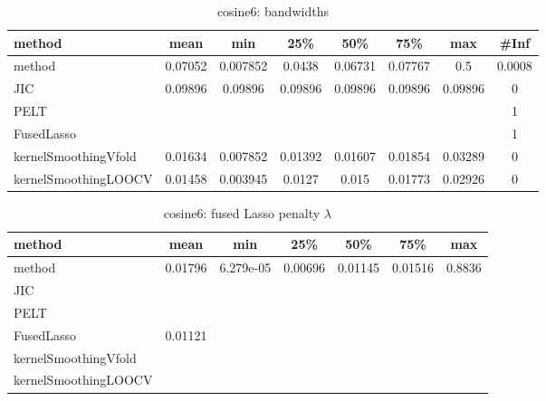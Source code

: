 \begin{table}[ht]
\centering
\begin{tabular}{l|c|ccccc|c}
  \hline
method & mean & min & 25\% & 50\% & 75\% & max & \#Inf \\ 
  \hline
method & 0.07052 & 0.007852 & 0.0438 & 0.06731 & 0.07767 &   0.5 & 0.0008 \\ 
  JIC & 0.09896 & 0.09896 & 0.09896 & 0.09896 & 0.09896 & 0.09896 &   0 \\ 
  PELT &  &  &  &  &  &  &   1 \\ 
  FusedLasso &  &  &  &  &  &  &   1 \\ 
  kernelSmoothingVfold & 0.01634 & 0.007852 & 0.01392 & 0.01607 & 0.01854 & 0.03289 &   0 \\ 
  kernelSmoothingLOOCV & 0.01458 & 0.003945 & 0.0127 & 0.015 & 0.01773 & 0.02926 &   0 \\ 
   \hline
\end{tabular}
\caption{cosine6: bandwidths} 
\label{tab:cosine6Bandwidths}
\end{table}
\begin{table}[ht]
\centering
\begin{tabular}{l|c|ccccc}
  \hline
method & mean & min & 25\% & 50\% & 75\% & max \\ 
  \hline
method & 0.01796 & 6.279e-05 & 0.00696 & 0.01145 & 0.01516 & 0.8836 \\ 
  JIC &  &  &  &  &  &  \\ 
  PELT &  &  &  &  &  &  \\ 
  FusedLasso & 0.01121 &  &  &  &  &  \\ 
  kernelSmoothingVfold &  &  &  &  &  &  \\ 
  kernelSmoothingLOOCV &  &  &  &  &  &  \\ 
   \hline
\end{tabular}
\caption{cosine6: fused Lasso penalty $\lambda$} 
\label{tab:cosine6Lambdas}
\end{table}
